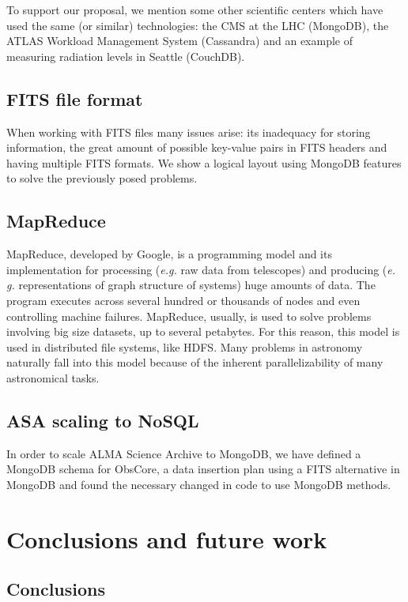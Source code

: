 \documentclass[a4paper,12pt]{article}
\begin{document}
To support our proposal, we mention some other scientific centers which have used the same (or similar) technologies: the CMS at the LHC (MongoDB), the ATLAS Workload Management System (Cassandra) and an example of measuring radiation levels in Seattle (CouchDB).


\subsection{FITS file format}
When working with FITS files many issues arise: its inadequacy for storing information, the great amount of possible key-value pairs in FITS headers and having multiple FITS formats. We show a logical layout using MongoDB features to solve the previously posed problems.


\subsection{MapReduce}
MapReduce, developed by Google, is a programming model and its implementation for processing (\textit{e.g.} raw data from telescopes) and producing (\textit{e. g.} representations of graph structure of systems) huge amounts of data. The program executes across several hundred or thousands of nodes and even controlling machine failures. MapReduce, usually, is used to solve problems involving big size datasets, up to several petabytes. For this reason, this model is used in distributed file systems, like HDFS. Many problems in astronomy naturally fall into this model because of the inherent parallelizability of many astronomical tasks.

\subsection{ASA scaling to NoSQL}
In order to scale ALMA Science Archive to MongoDB, we have defined a MongoDB schema for ObsCore, a data insertion plan using a FITS alternative in MongoDB and found the necessary changed in code to use MongoDB methods.

\section{Conclusions and future work}

\subsection{Conclusions}
\end{document}
